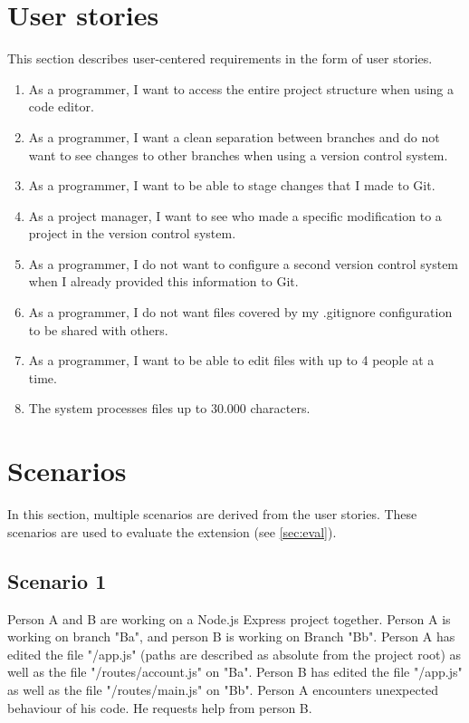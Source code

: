 \section{User stories}
This section describes user-centered requirements in the form of user stories.
\begin{enumerate}
\item As a programmer, I want to access the entire project structure when using a code editor.
\item As a programmer, I want a clean separation between branches and do not want to see changes to other branches when using a version control system.
\item As a programmer, I want to be able to stage changes that I made to Git.
\item As a project manager, I want to see who made a specific modification to a project in the version control system.
\item As a programmer, I do not want to configure a second version control system when I already provided this information to Git.
\item As a programmer, I do not want files covered by my .gitignore configuration to be shared with others.
\item As a programmer, I want to be able to edit files with up to 4 people at a time. 
\item The system processes files up to 30.000 characters.
\end{enumerate}

\section{Scenarios}
\label{sec:scenarios}
In this section, multiple scenarios are derived from the user stories. These scenarios are used to evaluate the extension (see \autoref{sec:eval}).

\subsection{Scenario 1}
\label{sec:scenario1}
Person A and B are working on a Node.js Express project together. Person A is working on branch "Ba", and person B is working on Branch "Bb".
Person A has edited the file "/app.js" (paths are described as absolute from the project root) as well as the file "/routes/account.js" on "Ba".
Person B has edited the file "/app.js" as well as the file "/routes/main.js" on "Bb".
Person A encounters unexpected behaviour of his code. He requests help from person B.

